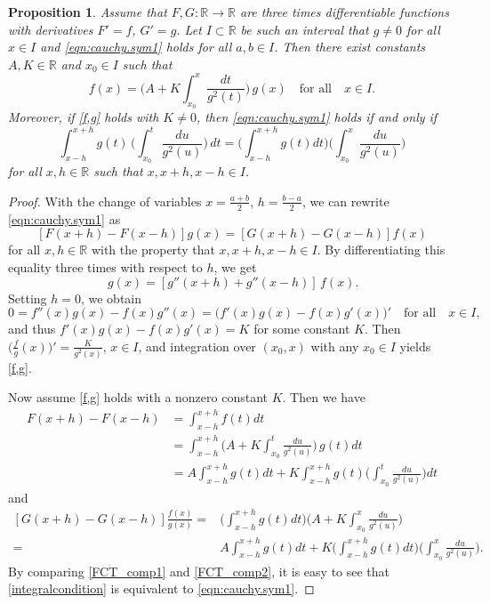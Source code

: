 \documentclass{birkjour}
\newtheorem{proposition}[theorem]{Proposition}
\begin{document}
\begin{proposition} 
\label{cauchy2}
Assume that $F,G: {{\mathbb R}} \to {{\mathbb R}}$ are three times differentiable functions with derivatives $F'=f$, $G'=g$. Let $I\subset {{\mathbb R}}$ be such an interval that $g\neq 0$ for all $x\in I$ and \eqref{eqn:cauchy.sym1} holds
for all $a,b \in I$. Then there exist constants $A, K\in{{\mathbb R}}$ and $x_{0}\in I$ such that 
\begin{equation} \label{f,g}
f(x) = \bigg(A + K \int_{x_{0}}^{x}\frac{dt}{g^{2}(t)}\bigg) \, g(x) \quad \text{for all} \quad x \in I.
\end{equation}
Moreover, if \eqref{f,g} holds with $K\neq0$, then \eqref{eqn:cauchy.sym1} holds if and only if  
\begin{equation} \label{integralcondition}
\int_{x-h}^{x+h} g(t)\, \Bigg(\int_{x_{0}}^{t}\frac{du}{g^{2}(u)} \Bigg) \,dt = \Bigg(\int_{x-h}^{x+h} g(t) dt\Bigg) \Bigg(\int_{x_{0}}^{x}\frac{du}{g^{2}(u)} \Bigg)  \end{equation} 
for all $  x,h \in {{\mathbb R}}$ such that $x, x+h, x-h\in I$.
\end{proposition}
\begin{proof} 
With the change of variables $x=\frac{a+b}{2}$, $h=\frac{b-a}{2}$, we can rewrite
\eqref{eqn:cauchy.sym1} as 
\begin{equation} 
\label{modifcauchy}
[F(x+h)-F(x-h)]g(x)= [G(x+h)-G(x-h)]f(x) 
\end{equation}
for all $x,h\in {{\mathbb R}}$ with the property that $x,x+h,x-h \in I$. By differentiating this equality three times with respect to $h$, we get
\begin{equation*}
[f''(x+h)+f''(x-h)]\,g(x) = [g''(x+h)+g''(x-h)]\,f(x).
\end{equation*}
Setting $h=0$, we obtain
\[
0=f''(x)g(x)-f(x)g''(x) = \bigl(f'(x)g(x)-f(x)g'(x)\bigr)' \quad \text{for all} \quad x\in I,
\]
and thus $f'(x)g(x)-f(x)g'(x)=K$ for some constant $K$. Then $\bigl(\frac{f}{g}(x)\bigr)'= \frac{K}{g^2(x)}$, $x \in I$, 
and integration over $(x_0,x)$ with any $x_0\in I$ yields \eqref{f,g}.

Now assume \eqref{f,g} holds with a nonzero constant $K$. Then we have
\begin{align}
\nonumber
F(x+h) - F(x-h) &= \int_{x-h}^{x+h}f(t) dt \\ \nonumber
                &= \int_{x-h}^{x+h} \bigg(A + K\int_{x_0}^t \frac{du}{g^2(u)} \bigg)\,g(t) dt\\ \label{FCT_comp1}
                &= A\int_{x-h}^{x+h} g(t) dt + K\int_{x-h}^{x+h} g(t)\bigg(\int_{x_0}^t \frac{du}{g^2(u)} \bigg) dt
\end{align}
and
\begin{align}
\nonumber
[G(x+h)-G(x-h)]\frac{f(x)}{g(x)} =& \Bigg(\int_{x-h}^{x+h} g(t) dt\Bigg) \Bigg(A + K\int_{x_0}^x \frac{du}{g^2(u)}\Bigg)\\\label{FCT_comp2}
                                 =& A\int_{x-h}^{x+h} g(t) dt + K\Bigg(\int_{x-h}^{x+h} g(t) dt\Bigg) \Bigg(\int_{x_{0}}^{x}\frac{du}{g^{2}(u)} \Bigg).
\end{align}
By comparing \eqref{FCT_comp1} and \eqref{FCT_comp2}, it is easy to see that \eqref{integralcondition} is equivalent to \eqref{eqn:cauchy.sym1}.
\end{proof} 
\end{document}
